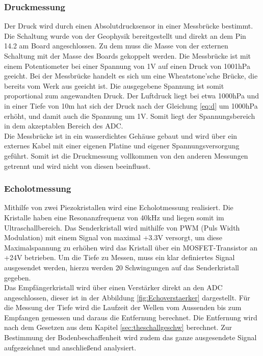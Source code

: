 \documentclass[12pt,a4paper,titlepage,headinclude,bibtotoc]{scrartcl}
\numberwithin{equation}{subsection}
\begin{document}
\subsubsection{Druckmessung}
\label{sec:durchdruck}
Der Druck wird durch einen Absolutdrucksensor in einer Messbrücke bestimmt.
Die Schaltung wurde von der Geophysik bereitgestellt und direkt an dem Pin 14.2 am Board angeschlossen.
Zu dem muss die Masse von der externen Schaltung mit der Masse des Boards gekoppelt werden.
Die Messbrücke ist mit einem Potentiometer bei einer Spannung von 1\si{\volt} auf einen Druck von 1001hPa geeicht.
Bei der Messbrücke handelt es sich um  eine Wheatstone'sche Brücke, die bereits vom Werk aus geeicht ist.
Die ausgegebene Spannung ist somit proportional zum angewandten Druck.
Der Luftdruck liegt bei etwa 1000hPa und in einer Tiefe von 10\si{\meter} hat sich der Druck nach der Gleichung \eqref{eq:d} um 1000hPa erhöht, und damit auch die Spannung um 1\si{\volt}.
Somit liegt der Spannungsbereich in dem akzeptablen Bereich des ADC.\\
Die Messbrücke ist in ein wasserdichtes Gehäuse gebaut und wird über ein externes Kabel mit einer eigenen Platine und eigener Spannungsversorgung geführt.
Somit ist die Druckmessung vollkommen von den anderen Messungen getrennt und wird nicht von diesen beeinflusst.

\subsubsection{Echolotmessung}
Mithilfe von zwei Piezokristallen wird eine Echolotmessung realisiert.
Die Kristalle haben eine Resonanzfrequenz von 40\si{\kilo\hertz} und liegen somit im Ultraschallbereich.
Das Senderkristall wird mithilfe von PWM (Puls Width Modulation) mit einem Signal von maximal +3.3\si{\volt} versorgt, um diese Maximalspannung zu erhöhen wird das Kristall über ein MOSFET-Transistor an +24\si{\volt} betrieben.
Um die Tiefe zu Messen, muss ein klar definiertes Signal ausgesendet werden, hierzu werden 20 Schwingungen auf das Senderkristall gegeben.\\
Das Empfängerkristall wird über einen Verstärker direkt an den ADC angeschlossen, dieser ist in der Abbildung \ref{fig:Echoverstaerker} dargestellt.
Für die Messung der Tiefe wird die Laufzeit der Wellen vom Aussenden bis zum Empfangen gemessen und daraus die Entfernung berechnet.
Die Entfernung wird nach dem Gesetzen aus dem Kapitel \ref{sec:theschallgeschw} berechnet.
Zur Bestimmung der Bodenbeschaffenheit wird zudem das ganze ausgesendete Signal aufgezeichnet und anschließend analysiert.
\end{document}
